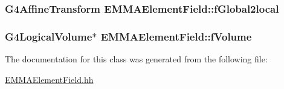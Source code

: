 \subsubsection[{\texorpdfstring{f\+Global2local}{fGlobal2local}}]{\setlength{\rightskip}{0pt plus 5cm}G4\+Affine\+Transform E\+M\+M\+A\+Element\+Field\+::f\+Global2local\hspace{0.3cm}{\ttfamily [protected]}}\hypertarget{classEMMAElementField_a7702673f0f70ababdfc04fe007ea9d51}{}\label{classEMMAElementField_a7702673f0f70ababdfc04fe007ea9d51}
\subsubsection[{\texorpdfstring{f\+Volume}{fVolume}}]{\setlength{\rightskip}{0pt plus 5cm}G4\+Logical\+Volume$\ast$ E\+M\+M\+A\+Element\+Field\+::f\+Volume\hspace{0.3cm}{\ttfamily [protected]}}\hypertarget{classEMMAElementField_a629f5c6b312c421ead41e82ae2e4e4a0}{}\label{classEMMAElementField_a629f5c6b312c421ead41e82ae2e4e4a0}


The documentation for this class was generated from the following file\+:\begin{DoxyCompactItemize}
\item 
\hyperlink{EMMAElementField_8hh}{E\+M\+M\+A\+Element\+Field.\+hh}\end{DoxyCompactItemize}
